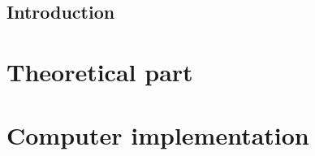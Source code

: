 \documentclass[12pt]{book}
\begin{document}

\chapter{Introduction}

\part{Theoretical part}




%
\part{Computer implementation}









\end{document}
